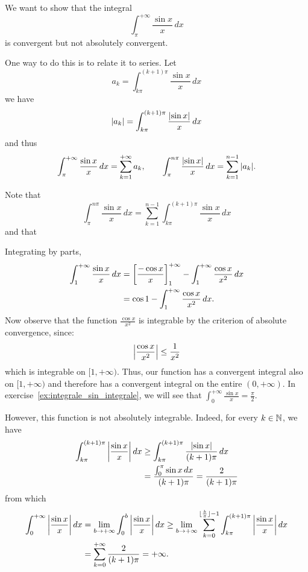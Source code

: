 \begin{example}
\label{ex:48864}%
\mymark{*}%
We want to show that the integral
\[
  \int_\pi^{+\infty} \frac{\sin x}{x}\, dx  
\]
is convergent but not absolutely convergent.

One way to do this is to relate it to series. Let 
\[
  a_k = \int_{k\pi}^{(k+1)\pi} \frac{\sin x}{x}\, dx
\]
we have
\[
  {\left|a_k\right|} = \int_{k\pi}^{(k+1)\pi} \frac{{\left|\sin x\right|}}{x}\, dx
\]
and thus 
\[
\int_\pi^{+\infty} \frac{\sin x}{x}\, dx
= \sum_{k=1}^{+\infty} a_k, \qquad
\int_\pi^{n\pi} \frac{{\left|\sin x\right|}}{x}\, dx
= \sum_{k=1}^{n-1} {\left|a_k\right|}.
\]



Note that 
\[
   \int_\pi^{n\pi} \frac{\sin x}{x}\, dx
   = \sum_{k=1}^{n-1} \int_{k\pi}^{(k+1)\pi} \frac{\sin x}{x}\, dx
\]
and that 



Integrating by parts,
\begin{align*}
  \int_1^{+\infty} \frac{\sin x}{x}\, dx
  &= {\left[ \frac{-\cos x}{x} \right]}_1^{+\infty} -
  \int_1^{+\infty} \frac{\cos x}{x^2} \, dx \\
  &= \cos 1 - \int_1^{+\infty} \frac{\cos x}{x^2}\, dx.
\end{align*}
Now observe that the function $\frac{\cos x}{x^2}$ is integrable by the
criterion of absolute convergence, since:
\[
  {\left|\frac{\cos x}{x^2}\right|} \le \frac{1}{x^2}
\]
which is integrable on $[1,+\infty)$. Thus, our function has a convergent
integral also on $[1,+\infty)$ and therefore has a convergent integral on the
entire $(0,+\infty)$. In exercise~\ref{ex:integrale_sin_integrale}, we will see
that $\int_0^{+\infty} \frac{\sin x}{x} = \frac \pi 2$.

However, this function is not absolutely integrable. Indeed, for every $k\in
{\mathbb N}$, we have
\begin{align*}
  \int_{k\pi}^{(k+1)\pi} {\left|\frac{\sin x} x\right|}\, dx
  &\ge \int_{k\pi}^{(k+1)\pi} \frac{{\left|\sin x\right|}}{(k+1)\pi}\, dx\\
  &= \frac{\int_0^\pi \sin x \, dx}{(k+1)\pi}
  = \frac{2}{(k+1)\pi}
\end{align*}
from which
\begin{align*}
  \int_0^{+\infty} {\left|\frac{\sin x}{x}\right|}\, dx
  & = \lim_{b\to +\infty} \int_0^b {\left|\frac{\sin x}{x}\right|}\, dx 
  \ge \lim_{b\to+\infty} \sum_{k=0}^{\lfloor \frac{b}{\pi}\rfloor-1} \int_{k\pi}^{(k+1)\pi}{\left|\frac{\sin x} x\right|}\, dx\\
  &= \sum_{k=0}^{+\infty} \frac{2}{(k+1)\pi} = +\infty.
\end{align*}
\end{example}

